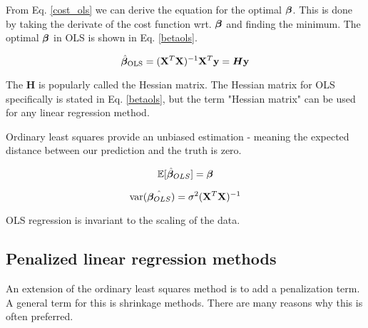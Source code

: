 From Eq. \ref{cost_ols} we can derive the equation for the optimal $\boldsymbol{\beta}$. This is done by taking the derivate of the cost function wrt. $\boldsymbol{\beta}$ and finding the minimum. The optimal $\boldsymbol{\beta}$ in OLS is shown in Eq. \ref{betaols}. 

\begin{equation}\label{betaols}
    \hat{\boldsymbol{\beta}}_{\text{OLS}} = (\mathbf{X}^T\mathbf{X})^{-1}\mathbf{X}^T\mathbf{y} = \boldsymbol{H}\mathbf{y}
\end{equation}

The $\boldsymbol{H}$ is popularly called the Hessian matrix. The Hessian matrix for OLS specifically is stated in Eq. \ref{betaols}, but the term "Hessian matrix" can be used for any linear regression method.


Ordinary least squares provide an unbiased estimation - meaning the expected distance between our prediction and the truth is zero. 

\begin{equation}
    \mathbb{E}[\hat{\boldsymbol{\beta}}_{OLS}] = \boldsymbol{\beta}
\end{equation}

\begin{equation}
   \text{var}(\hat{\boldsymbol{\beta}_{OLS}}) = \sigma^2 (\mathbf{X}^T\mathbf{X})^{-1}
\end{equation}

OLS regression is invariant to the scaling of the data.



\subsection{Penalized linear regression methods}

An extension of the ordinary least squares method is to add a penalization term. A general term for this is shrinkage methods. There are many reasons why this is often preferred. 


